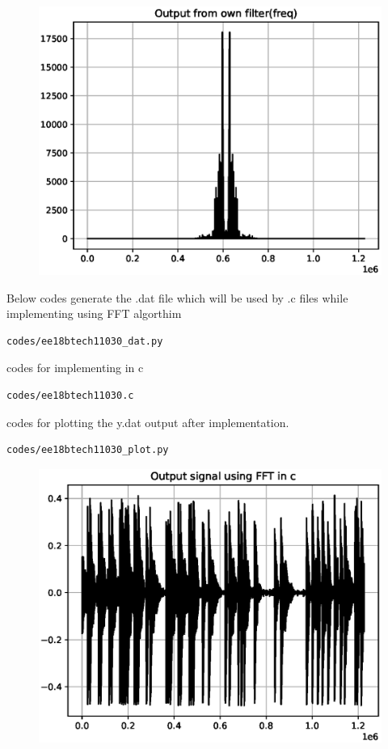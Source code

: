 \documentclass[journal,12pt,twocolumn]{IEEEtran}
\begin{document}
\begin{figure}[!ht]
\centering
\includegraphics[width=1\columnwidth,height=0.8\columnwidth]{./figs/ee18btech11030_3.eps}
\caption{}
\label{fig:ee18btech11030_3}
\end{figure}

Below codes generate the .dat file which will be used by .c files while implementing using FFT algorthim
\begin{lstlisting}
codes/ee18btech11030_dat.py
\end{lstlisting}
codes for implementing in c
\begin{lstlisting}
codes/ee18btech11030.c
\end{lstlisting}
codes for plotting the y.dat output after implementation.
\begin{lstlisting}
codes/ee18btech11030_plot.py
\end{lstlisting}

\begin{figure}[!ht]
\centering
\includegraphics[width=1\columnwidth,height=0.8\columnwidth]{./figs/ee18btech11030_4.eps}
\caption{}
\label{fig:ee18btech11030_4}
\end{figure}
\end{document}
